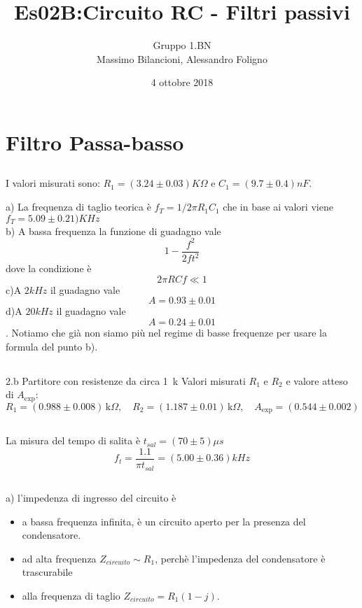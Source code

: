 \documentclass[10pt,a4paper]{article}
\author{Gruppo 1.BN \\ Massimo Bilancioni, Alessandro Foligno }
\title{Es02B:Circuito RC - Filtri passivi}
\begin{document}
\date{4 ottobre 2018}
\maketitle


\section{Filtro Passa-basso}
\subsection{}
\label{passa-basso}

I valori misurati sono: $R_1  = (3.24\pm 0.03 )K\Omega$ e  $C_1  = (9.7\pm 0.4 )nF$.

a) La frequenza di taglio teorica è  $f_T = 1/2\pi R_1 C_1$ che in base ai valori viene $f_T = 5.09\pm 0.21)KHz$\\
b) A bassa frequenza la funzione di guadagno vale \[1-\frac{f^2}{2ft^2}\] dove la condizione è \[2\pi RCf\ll1\]
c)A $2kHz$ il guadagno vale \[A=0.93\pm0.01\]
d)A $20kHz$ il guadagno vale \[A=0.24\pm0.01\]. Notiamo che già non siamo più nel regime di basse frequenze per usare la formula del punto b).
\subsection{}{2.b Partitore con resistenze da circa 1~k}
Valori misurati $R_1$ e $R_2$ e valore atteso di $A_\mathrm{exp}$:
\[
R_1 = (0.988  \pm0.008  ) \,\mathrm{k}\Omega, \quad
R_2 = (1.187 \pm 0.01 ) \,\mathrm{k}\Omega, \quad
A_\mathrm{exp} = ( 0.544 \pm 0.002 ) 
\]




\subsection{}

La misura del tempo di salita è $ t_{sal} = (70\pm 5)\mu s$
\[ f_t = \frac{1.1}{\pi t_{sal}} = (5.00 \pm 0.36) kHz \]

\subsection{}
a) l'impedenza di ingresso del circuito è
\begin{itemize}

\item a bassa frequenza  infinita, è un circuito aperto per la presenza del condensatore.
\item ad alta frequenza $Z_{circuito}\sim R_1$, perchè l'impedenza del condensatore è trascurabile
\item alla frequenza di taglio  $Z_{circuito} = R_1(1-j)$.

\end{itemize}
\end{document}
